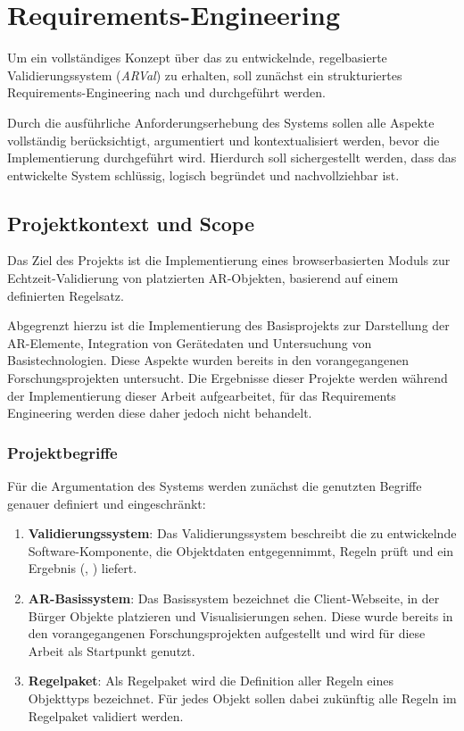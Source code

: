 \section{Requirements-Engineering}\label{section:Requirements-Engineering}

Um ein vollständiges Konzept über das zu entwickelnde, regelbasierte Validierungssystem (\textit{ARVal}) zu erhalten, soll zunächst ein strukturiertes Requirements-Engineering nach \textcite{ieeeISOIECIEEE2018} und \textcite{ruppRequirementsEngineeringUndManagement2021} durchgeführt werden.

Durch die ausführliche Anforderungserhebung des Systems sollen alle Aspekte vollständig berücksichtigt, argumentiert und kontextualisiert werden, bevor die Implementierung durchgeführt wird. Hierdurch soll sichergestellt werden, dass das entwickelte System schlüssig, logisch begründet und nachvollziehbar ist.

\subsection{Projektkontext und Scope}\label{subsection:Projektkontext und Scope}

Das Ziel des Projekts ist die Implementierung eines browserbasierten Moduls zur Echtzeit-Validierung von platzierten AR-Objekten, basierend auf einem definierten Regelsatz.

Abgegrenzt hierzu ist die Implementierung des Basisprojekts zur Darstellung der AR-Elemente, Integration von Gerätedaten und Untersuchung von Basistechnologien. Diese Aspekte wurden bereits in den vorangegangenen Forschungsprojekten untersucht. Die Ergebnisse dieser Projekte werden während der Implementierung  dieser Arbeit aufgearbeitet, für das Requirements Engineering werden diese daher jedoch nicht behandelt.

\subsubsection{Projektbegriffe}

Für die Argumentation des Systems werden zunächst die genutzten Begriffe genauer definiert und eingeschränkt:

\begin{enumerate}
    \item \textbf{Validierungssystem}: Das Validierungssystem beschreibt die zu entwickelnde Software-Komponente, die Objektdaten entgegennimmt, Regeln prüft und ein Ergebnis (, ) liefert.
    \item \textbf{AR-Basissystem}: Das Basissystem bezeichnet die Client-Webseite, in der Bürger Objekte platzieren und Visualisierungen sehen. Diese wurde bereits in den vorangegangenen Forschungsprojekten aufgestellt und wird für diese Arbeit als Startpunkt genutzt.
    \item \textbf{Regelpaket}: Als Regelpaket wird die Definition aller Regeln eines Objekttyps bezeichnet. Für jedes Objekt sollen dabei zukünftig alle Regeln im Regelpaket validiert werden.
\end{enumerate}

